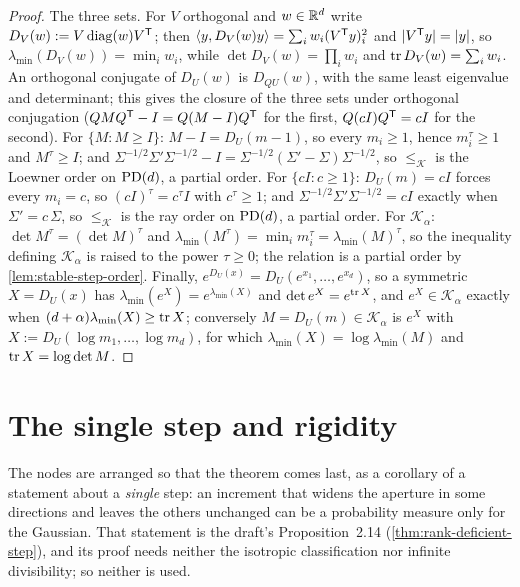 \begin{proof}
The three sets. For $V$ orthogonal and $w \in \mathbb{R}^d$ write $D_V(w) := V\operatorname{diag}(w)V^{\mathsf{T}}$;
then $\langle y, D_V(w)y\rangle = \sum_i w_i (V^{\mathsf{T}}y)_i^2$ and $|V^{\mathsf{T}}y| = |y|$, so
$\lambda_{\min}(D_V(w)) = \min_i w_i$, while $\det D_V(w) = \prod_i w_i$ and
$\operatorname{tr} D_V(w) = \sum_i w_i$. An orthogonal conjugate of $D_U(w)$ is $D_{QU}(w)$, with the same
least eigenvalue and determinant; this gives the closure of the three sets under orthogonal
conjugation ($QMQ^{\mathsf{T}} - I = Q(M - I)Q^{\mathsf{T}}$ for the first, $Q(cI)Q^{\mathsf{T}} = cI$ for the second). For
$\{M : M \ge I\}$: $M - I = D_U(m - 1)$, so every $m_i \ge 1$, hence $m_i^\tau \ge 1$ and
$M^\tau \ge I$; and $\Sigma^{-1/2}\Sigma'\Sigma^{-1/2} - I = \Sigma^{-1/2}(\Sigma' - \Sigma)\Sigma^{-1/2}$, so
$\le_{\mathcal K}$ is the Loewner order on $\mathrm{PD}(d)$, a partial order. For $\{cI : c \ge 1\}$:
$D_U(m) = cI$ forces every $m_i = c$, so $(cI)^\tau = c^\tau I$ with $c^\tau \ge 1$; and
$\Sigma^{-1/2}\Sigma'\Sigma^{-1/2} = cI$ exactly when $\Sigma' = c\,\Sigma$, so $\le_{\mathcal K}$ is
the ray order on $\mathrm{PD}(d)$, a partial order. For $\mathcal K_\alpha$:
$\det M^\tau = (\det M)^\tau$ and $\lambda_{\min}(M^\tau) = \min_i m_i^\tau = \lambda_{\min}(M)^\tau$, so the inequality
defining $\mathcal K_\alpha$ is raised to the power $\tau \ge 0$; the relation is a partial order by
\ref{lem:stable-step-order}. Finally, $e^{D_U(x)} = D_U(e^{x_1}, \dots, e^{x_d})$, so a symmetric
$X = D_U(x)$ has $\lambda_{\min}(e^X) = e^{\lambda_{\min}(X)}$ and $\det e^X = e^{\operatorname{tr} X}$, and $e^X \in
\mathcal K_\alpha$ exactly when $(d+\alpha)\lambda_{\min}(X) \ge \operatorname{tr} X$; conversely $M = D_U(m) \in
\mathcal K_\alpha$ is $e^X$ with $X := D_U(\log m_1, \dots, \log m_d)$, for which
$\lambda_{\min}(X) = \log \lambda_{\min}(M)$ and $\operatorname{tr} X = \log\det M$.
\end{proof}

\section{The single step and rigidity}
\label{sec:affine-single-step}

The nodes are arranged so that the theorem comes last, as a corollary of a statement about a
\emph{single} step: an increment that widens the aperture in some directions and leaves the others
unchanged can be a probability measure only for the Gaussian. That statement is the draft's
Proposition~2.14 (\ref{thm:rank-deficient-step}), and its proof needs neither the isotropic
classification nor infinite divisibility; so neither is used.

